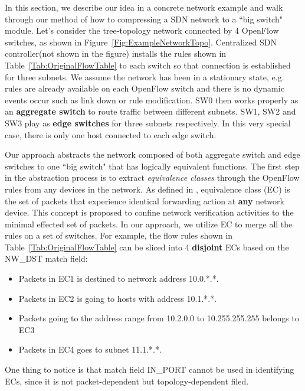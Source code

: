 In this section, we describe our idea in a concrete network example and
walk through our method of how to compressing a SDN network to a ``big switch" module.
Let's consider the tree-topology network connected by 4 OpenFlow switches,
as shown in Figure~\ref{Fig:ExampleNetworkTopo}.
Centralized SDN controller(not shown in the figure) installs the rules shown in
Table~\ref{Tab:OriginalFlowTable} to each switch so that connection is established
for three subnets.
We assume the network has been in a stationary state, e.g. rules are already available
on each OpenFlow switch and there is no dynamic events occur such as link down
or rule modification.
SW0 then works properly as an \textbf{aggregate switch} to route traffic
between different subnets.
SW1, SW2 and SW3 play as \textbf{edge switches} for three subnets respectively.
In this very special case, there is only one host connected to each edge switch.

Our approach abstracts the network composed of both aggregate switch and edge switches
to one ``big switch" that has logically equivalent functions.
The first step in the abstraction process is to extract \textit{equivalence classes}
through the OpenFlow rules from any devices in the network.
As defined in \cite{Veriflow}, equivalence class (EC) is the set of packets that
experience identical forwarding action at \textbf{any} network device.
This concept is proposed to confine network verification activities to the minimal
effected set of packets\cite{Veriflow}.
In our approach, we utilize EC to merge all the rules on a set of switches.
For example, the flow rules shown in Table~\ref{Tab:OriginalFlowTable} can be sliced into
4 \textbf{disjoint} ECs based on the NW\_DST match field:
\begin{itemize}
\item Packets in EC1 is destined to network address 10.0.*.*.
\item Packets in EC2 is going to hosts with address 10.1.*.*.
\item Packets going to the address range from 10.2.0.0 to 10.255.255.255 belongs to EC3
\item Packets in EC4 goes to subnet 11.1.*.*. 
\end{itemize}
One thing to notice is that match field IN\_PORT cannot be used in identifying ECs,
since it is not packet-dependent but topology-dependent filed.

